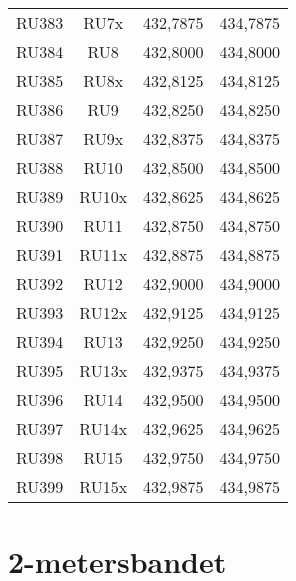 \begin{tabular}{ r | c | l | l }
	RU383 & RU7x  & 432,7875       & 434,7875       \\
	RU384 & RU8   & 432,8000       & 434,8000       \\
	RU385 & RU8x  & 432,8125       & 434,8125       \\
	RU386 & RU9   & 432,8250       & 434,8250       \\
	RU387 & RU9x  & 432,8375       & 434,8375       \\
	RU388 & RU10  & 432,8500       & 434,8500       \\
	RU389 & RU10x & 432,8625       & 434,8625       \\
	RU390 & RU11  & 432,8750       & 434,8750       \\
	RU391 & RU11x & 432,8875       & 434,8875       \\
	RU392 & RU12  & 432,9000       & 434,9000       \\
	RU393 & RU12x & 432,9125       & 434,9125       \\
	RU394 & RU13  & 432,9250       & 434,9250       \\
	RU395 & RU13x & 432,9375       & 434,9375       \\
	RU396 & RU14  & 432,9500       & 434,9500       \\
	RU397 & RU14x & 432,9625       & 434,9625       \\
	RU398 & RU15  & 432,9750       & 434,9750       \\
	RU399 & RU15x & 432,9875       & 434,9875       \\
\end{tabular}

\newpage

\section{2-metersbandet}

